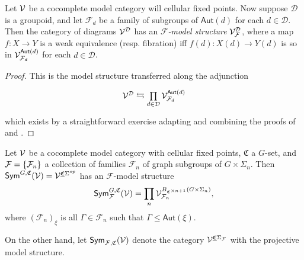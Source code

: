 \documentclass[a4paper,10pt
,draft
]{article}%
\newcommand{\UC}{\underline{\mathfrak C}}
\renewcommand{\F}{\mathcal F}
\renewcommand{\1}{\ensuremath{\mathbb{id}}}
\begin{document}
\begin{proposition}
      Let $\mathcal V$ be a cocomplete model category will cellular fixed points.
      Now suppose $\mathcal D$ is a groupoid, and let $\F_d$ be a family of subgroups of $\mathsf{Aut}(d)$ for each $d \in \mathcal D$.
      Then the category of diagrams $\mathcal V^{\mathcal D}$ has an \textit{$\F$-model structure} $\V^\D_\F$, where
      a map $f: X \to Y$ is a
      weak equivalence (resp. fibration) iff $f(d): X(d) \to Y(d)$ is so in $\V^{\mathsf{Aut}(d)}_{\F_d}$ for each $d \in \mathcal D$.
\end{proposition}
\begin{proof}
      This is the model structure transferred along the adjunction
      \begin{equation}
            \begin{tikzcd}
                  \V^\D \leftrightarrows
                  \mathop{\prod}\limits_{d \in \D}\V^{\mathsf{Aut}(d)}_{\F_d}
            \end{tikzcd}
      \end{equation}
      which exists by a straightforward exercise adapting and combining the proofs of
      \cite[Thm 11.6.1]{Hir03} and \cite[Prop 2.6]{Ste16}.
\end{proof}

\begin{example}
      Let $\mathcal V$ be a cocomplete model category with cellular fixed points,
      $\mathfrak C$ a $G$-set, and $\F = \set{\F_n}$ a collection of families $\F_n$ of graph subgroups of $G \times \Sigma_n$.
      Then $\Sym^{G,\mathfrak C}(\V) = \V^{\UC\Sigma^{op}}$ has an $\F$-model structure
      \begin{equation}
            \Sym^{G,\mathfrak C}_\F(\V) = \prod_n \V^{B_{\mathfrak C^{\times n+1}}(G \times \Sigma_n)}_{\F_n},
      \end{equation}
      where
      $(\F_n)_{\xi}$ is all $\Gamma \in \F_n$ such that $\Gamma \leq \mathsf{Aut}(\xi)$.
\end{example}

On the other hand, let $\Sym_{\F, \mathfrak C}(\V)$ denote the category $\V^{\UC\Sigma_\F}$ with the projective model structure.
\end{document}
